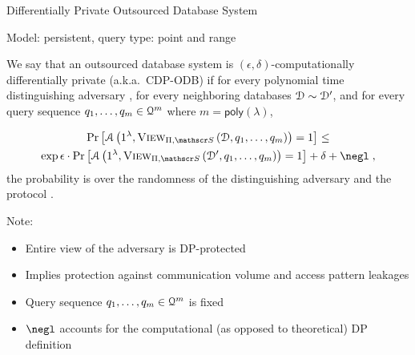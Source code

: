 	\begin{frame}{Differentially Private Outsourced Database System}

		Model: \alert{persistent}, query type: \alert{point} and \alert{range}

		\begin{definition}
			\justify%

			We say that an outsourced database system \protocol{} is $(\epsilon, \delta)$-computationally differentially private (a.k.a.~CDP-ODB) if for every polynomial time distinguishing adversary \adversary{}, for every neighboring databases $\mathcal{D} \sim \mathcal{D}^\prime$, and for every query sequence $\fromNtoM{\query}{1}{m} \in \querySet^m$ where $m = \mathsf{poly}(\lambda)$,

			\begin{multline*}
				\probability{\adversary \left( 1^\lambda, \view{\protocol, \server}{\database, \fromNtoM{\query}{1}{m}} \right) = 1 } \leq \\
				\exp{\epsilon} \cdot \probability{\adversary \left( 1^\lambda, \view{\protocol ,\server}{\database^\prime, \fromNtoM{\query}{1}{m}} \right) = 1} + \delta + \negl \; ,
			\end{multline*}
			the probability is over the randomness of the distinguishing adversary \adversary{} and the protocol \protocol{}.
		\end{definition}

		\pause%

		Note:
		\begin{itemize}
			\item Entire view of the adversary is DP-protected
			\item Implies protection against communication volume and access pattern leakages
			\item Query sequence $\fromNtoM{\query}{1}{m} \in \querySet^m$ is fixed
			\item $\negl$ accounts for the computational (as opposed to theoretical) DP definition
		\end{itemize}

	\end{frame}

